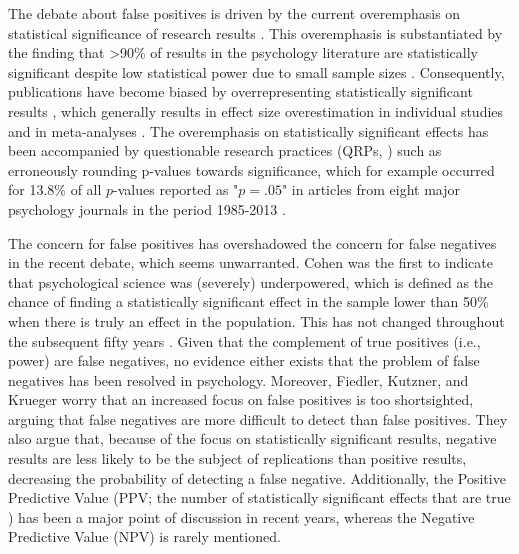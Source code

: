 \documentclass{article}
\begin{document}
The debate about false positives is driven by the current overemphasis on statistical significance of research results \cite{Giner-Sorolla2012-wn}. This overemphasis is substantiated by the finding that >90\% of results in the psychology literature are statistically significant \cite{Open_Science_Collaboration2015-zs,Sterling1995-fe,Sterling1959-pf} despite low statistical power due to small sample sizes \cite{Cohen1962-jc,Sedlmeier1989-yc,Marszalek2011-rf,Bakker2012-tf}. Consequently, publications have become biased by overrepresenting statistically significant results \cite{Greenwald1975-ck}, which generally results in effect size overestimation in individual studies \cite{Nuijten2015-od} and in meta-analyses \cite{Van_Assen2015-gg,Lane_1978,Rothstein2005-zg,Borenstein2009-vs}. The overemphasis on statistically significant effects has been accompanied by questionable research practices (QRPs, \cite{John2012-uj}) such as erroneously rounding p-values towards significance, which for example occurred for 13.8\% of all $p$-values reported as "$p =.05$" in articles from eight major psychology journals in the period 1985-2013 \cite{Hartgerink2016-mm}.

The concern for false positives has overshadowed the concern for false negatives in the recent debate, which seems unwarranted. Cohen \cite{Cohen1962-jc} was the first to indicate that psychological science was (severely) underpowered, which is defined as the chance of finding a statistically significant effect in the sample lower than 50\% when there is truly an effect in the population. This has not changed throughout the subsequent fifty years \cite{Bakker2012-tf,Fraley2014-xs}. Given that the complement of true positives (i.e., power) are false negatives, no evidence either exists that the problem of false negatives has been resolved in psychology. Moreover, Fiedler, Kutzner, and Krueger \cite{Fiedler2012-gx} worry that an increased focus on false positives is too shortsighted, arguing that false negatives are more difficult to detect than false positives. They also argue that, because of the focus on statistically significant results, negative results are less likely to be the subject of replications than positive results, decreasing the probability of detecting a false negative. Additionally, the Positive Predictive Value (PPV; the number of statistically significant effects that are true \cite{Ioannidis2005-am}) has been a major point of discussion in recent years, whereas the Negative Predictive Value (NPV) is rarely mentioned.
\end{document}
